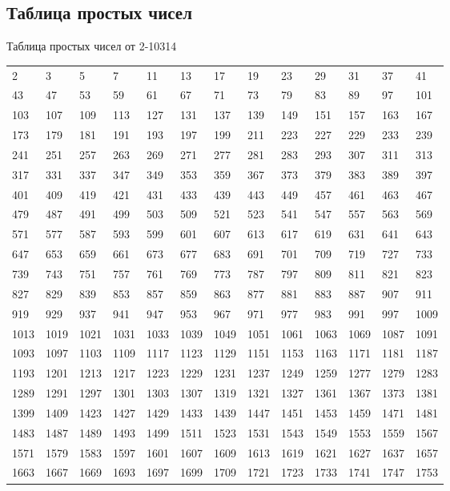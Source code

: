 \documentclass[12pt, a4paper]{article}
\begin{document}
\subsection{Таблица простых чисел}

Таблица простых чисел от 2-10314

\begin{longtable}{lllll lllll lll}
2 &3 &5 &7 &11 &13 &17 &19 &23 &29 &31 &37 &41 \\
43 &47 &53 &59 &61 &67 &71 &73 &79 &83 &89 &97 &101 \\
103 &107 &109 &113 &127 &131 &137 &139 &149 &151 &157 &163 &167 \\
173 &179 &181 &191 &193 &197 &199 &211 &223 &227 &229 &233 &239 \\
241 &251 &257 &263 &269 &271 &277 &281 &283 &293 &307 &311 &313 \\
317 &331 &337 &347 &349 &353 &359 &367 &373 &379 &383 &389 &397 \\
401 &409 &419 &421 &431 &433 &439 &443 &449 &457 &461 &463 &467 \\
479 &487 &491 &499 &503 &509 &521 &523 &541 &547 &557 &563 &569 \\
571 &577 &587 &593 &599 &601 &607 &613 &617 &619 &631 &641 &643 \\
647 &653 &659 &661 &673 &677 &683 &691 &701 &709 &719 &727 &733 \\
739 &743 &751 &757 &761 &769 &773 &787 &797 &809 &811 &821 &823 \\
827 &829 &839 &853 &857 &859 &863 &877 &881 &883 &887 &907 &911 \\
919 &929 &937 &941 &947 &953 &967 &971 &977 &983 &991 &997 &1009 \\
1013 &1019 &1021 &1031 &1033 &1039 &1049 &1051 &1061 &1063 &1069 &1087 &1091 \\
1093 &1097 &1103 &1109 &1117 &1123 &1129 &1151 &1153 &1163 &1171 &1181 &1187 \\
1193 &1201 &1213 &1217 &1223 &1229 &1231 &1237 &1249 &1259 &1277 &1279 &1283 \\
1289 &1291 &1297 &1301 &1303 &1307 &1319 &1321 &1327 &1361 &1367 &1373 &1381 \\
1399 &1409 &1423 &1427 &1429 &1433 &1439 &1447 &1451 &1453 &1459 &1471 &1481 \\
1483 &1487 &1489 &1493 &1499 &1511 &1523 &1531 &1543 &1549 &1553 &1559 &1567 \\
1571 &1579 &1583 &1597 &1601 &1607 &1609 &1613 &1619 &1621 &1627 &1637 &1657 \\
1663 &1667 &1669 &1693 &1697 &1699 &1709 &1721 &1723 &1733 &1741 &1747 &1753 \\

\end{longtable}
\end{document}
